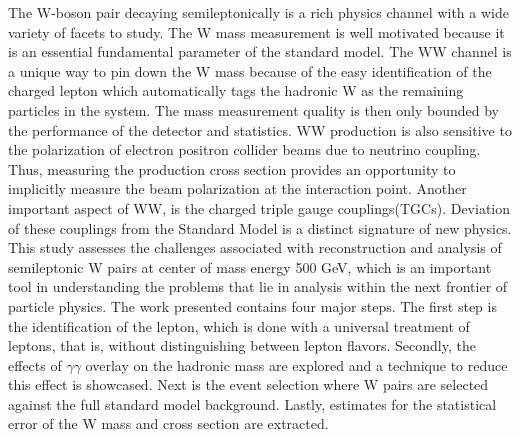 The W-boson pair decaying semileptonically is a rich physics channel with a wide variety of facets to study. The W mass measurement is well motivated because it is an essential fundamental parameter of the standard model. The WW channel is a unique way to pin down the W mass because of the easy identification of the charged lepton which automatically tags the hadronic W as the remaining particles in the system. The mass measurement quality is then only bounded by the performance of the detector and statistics. WW production is also sensitive to the polarization of electron positron collider beams due to neutrino coupling. Thus,  measuring the production cross section provides an opportunity to implicitly measure the beam polarization at the interaction point. Another important aspect of WW, is the charged triple gauge couplings(TGCs). Deviation of these couplings from the Standard Model is a distinct signature of new physics. This study assesses the challenges associated with reconstruction and analysis of semileptonic W pairs at center of mass energy 500 GeV, which is an important tool in understanding the problems that lie in analysis within the next frontier of particle physics. The work presented contains four major steps. The first step is the identification of the lepton, which is done with a universal treatment of leptons, that is, without distinguishing between lepton flavors.  Secondly, the effects of $\gamma\gamma$ overlay on the hadronic mass are explored and a technique to reduce this effect is showcased. Next is the event selection where W pairs are selected against the full standard model background. Lastly, estimates for the statistical error of the W mass and cross section are extracted.